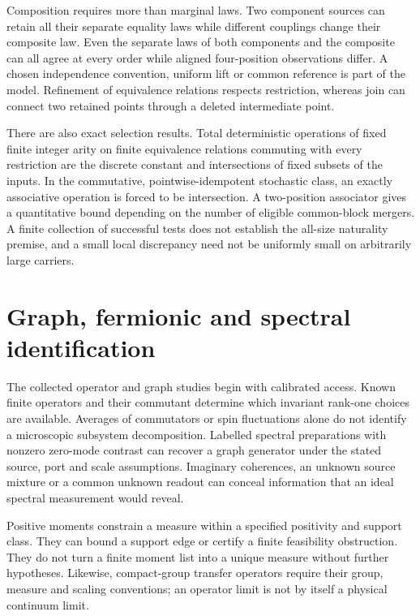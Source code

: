 Composition requires more than marginal laws. Two component sources can retain all their separate equality laws while different couplings change their composite law. Even the separate laws of both components and the composite can all agree at every order while aligned four-position observations differ. A chosen independence convention, uniform lift or common reference is part of the model. Refinement of equivalence relations respects restriction, whereas join can connect two retained points through a deleted intermediate point.

There are also exact selection results. Total deterministic operations of fixed finite integer arity on finite equivalence relations commuting with every restriction are the discrete constant and intersections of fixed subsets of the inputs. In the commutative, pointwise-idempotent stochastic class, an exactly associative operation is forced to be intersection. A two-position associator gives a quantitative bound depending on the number of eligible common-block mergers. A finite collection of successful tests does not establish the all-size naturality premise, and a small local discrepancy need not be uniformly small on arbitrarily large carriers.

\section{Graph, fermionic and spectral identification}
\label{col:spectral}

The collected operator and graph studies begin with calibrated access. Known finite operators and their commutant determine which invariant rank-one choices are available. Averages of commutators or spin fluctuations alone do not identify a microscopic subsystem decomposition. Labelled spectral preparations with nonzero zero-mode contrast can recover a graph generator under the stated source, port and scale assumptions. Imaginary coherences, an unknown source mixture or a common unknown readout can conceal information that an ideal spectral measurement would reveal.

Positive moments constrain a measure within a specified positivity and support class. They can bound a support edge or certify a finite feasibility obstruction. They do not turn a finite moment list into a unique measure without further hypotheses. Likewise, compact-group transfer operators require their group, measure and scaling conventions; an operator limit is not by itself a physical continuum limit.

